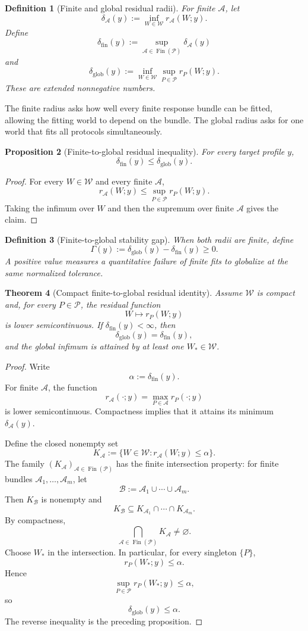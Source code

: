 \documentclass[11pt]{article}
\newtheorem{definition}{Definition}[section]
\newtheorem{proposition}[definition]{Proposition}
\newtheorem{theorem}[definition]{Theorem}
\newcommand{\W}{\mathcal W}
\newcommand{\Pcal}{\mathcal P}
\newcommand{\Acal}{\mathcal A}
\newcommand{\Bcal}{\mathcal B}
\newcommand{\Fin}{\operatorname{Fin}}
\begin{document}
\begin{definition}[Finite and global residual radii]
For finite $\Acal$, let
\[
\delta_{\Acal}(y)
:=
\inf_{W\in\W} r_{\Acal}(W;y).
\]
Define
\[
\delta_{\mathrm{fin}}(y)
:=
\sup_{\Acal\in\Fin(\Pcal)}
\delta_{\Acal}(y)
\]
and
\[
\delta_{\mathrm{glob}}(y)
:=
\inf_{W\in\W}
\sup_{P\in\Pcal}r_P(W;y).
\]
These are extended nonnegative numbers.
\end{definition}

The finite radius asks how well every finite response bundle can be fitted,
allowing the fitting world to depend on the bundle. The global radius asks for
one world that fits all protocols simultaneously.

\begin{proposition}[Finite-to-global residual inequality]
For every target profile $y$,
\[
\delta_{\mathrm{fin}}(y)
\le
\delta_{\mathrm{glob}}(y).
\]
\end{proposition}

\begin{proof}
For every $W\in\W$ and every finite $\Acal$,
\[
r_{\Acal}(W;y)
\le
\sup_{P\in\Pcal}r_P(W;y).
\]
Taking the infimum over $W$ and then the supremum over finite $\Acal$ gives the
claim.
\end{proof}

\begin{definition}[Finite-to-global stability gap]
When both radii are finite, define
\[
\Gamma(y)
:=
\delta_{\mathrm{glob}}(y)
-
\delta_{\mathrm{fin}}(y)
\ge0.
\]
A positive value measures a quantitative failure of finite fits to globalize
at the same normalized tolerance.
\end{definition}

\begin{theorem}[Compact finite-to-global residual identity]
\label{thm:robust-compact}
Assume $\W$ is compact and, for every $P\in\Pcal$, the residual function
\[
W\longmapsto r_P(W;y)
\]
is lower semicontinuous. If $\delta_{\mathrm{fin}}(y)<\infty$, then
\[
\delta_{\mathrm{glob}}(y)
=
\delta_{\mathrm{fin}}(y),
\]
and the global infimum is attained by at least one $W_\ast\in\W$.
\end{theorem}

\begin{proof}
Write
\[
\alpha:=\delta_{\mathrm{fin}}(y).
\]
For finite $\Acal$, the function
\[
r_{\Acal}(\cdot;y)
=
\max_{P\in\Acal}r_P(\cdot;y)
\]
is lower semicontinuous. Compactness implies that it attains its minimum
$\delta_{\Acal}(y)$.

Define the closed nonempty set
\[
K_{\Acal}
:=
\{W\in\W:r_{\Acal}(W;y)\le\alpha\}.
\]
The family $(K_{\Acal})_{\Acal\in\Fin(\Pcal)}$ has the finite intersection
property: for finite bundles $\Acal_1,\ldots,\Acal_m$, let
\[
\Bcal:=\Acal_1\cup\cdots\cup\Acal_m.
\]
Then $K_{\Bcal}$ is nonempty and
\[
K_{\Bcal}\subseteq
K_{\Acal_1}\cap\cdots\cap K_{\Acal_m}.
\]
By compactness,
\[
\bigcap_{\Acal\in\Fin(\Pcal)}K_{\Acal}\neq\varnothing.
\]
Choose $W_\ast$ in the intersection. In particular, for every singleton
$\{P\}$,
\[
r_P(W_\ast;y)\le\alpha.
\]
Hence
\[
\sup_{P\in\Pcal}r_P(W_\ast;y)\le\alpha,
\]
so
\[
\delta_{\mathrm{glob}}(y)\le\alpha.
\]
The reverse inequality is the preceding proposition.
\end{proof}
\end{document}
